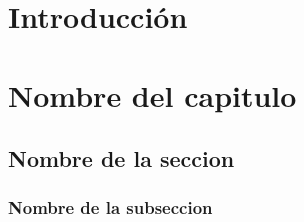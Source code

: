 \documentclass[10pt,a4paper,openany]{book}
\author{Miguel Angel Rodríguez Guzmán}
\begin{document}

\tableofcontents
	
\chapter*{Introducción}
	
		
\chapter{Nombre del capitulo}
	
	\section{Nombre de la seccion}  
	
	\subsection{Nombre de la subseccion}
	
	
\end{document}
